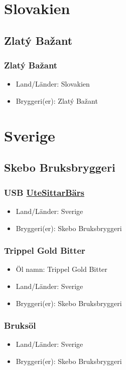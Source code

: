 \documentclass[11pt]{article}
\begin{document}
\section{Slovakien}
\label{sec:orgfefcc7f}
\subsection{Zlatý Bažant}
\label{sec:org8526919}
\subsubsection{Zlatý Bažant}
\label{sec:org3214313}
\begin{itemize}
\item Land/Länder: Slovakien
\item Bryggeri(er): Zlatý Bažant
\end{itemize}
\section{Sverige}
\label{sec:org54a90af}
\subsection{Skebo Bruksbryggeri}
\label{sec:org3f8a9bc}
\subsubsection{USB \underline{UteSittarBärs}}
\label{sec:orge1babe6}
\begin{itemize}
\item Land/Länder: Sverige
\item Bryggeri(er): Skebo Bruksbryggeri
\end{itemize}
\subsubsection{Trippel Gold Bitter}
\label{sec:org76c371f}
\begin{itemize}
\item Öl namn: Trippel Gold Bitter
\item Land/Länder: Sverige
\item Bryggeri(er): Skebo Bruksbryggeri
\end{itemize}
\subsubsection{Bruksöl}
\label{sec:org495d734}
\begin{itemize}
\item Land/Länder: Sverige
\item Bryggeri(er): Skebo Bruksbryggeri
\end{itemize}
\end{document}
